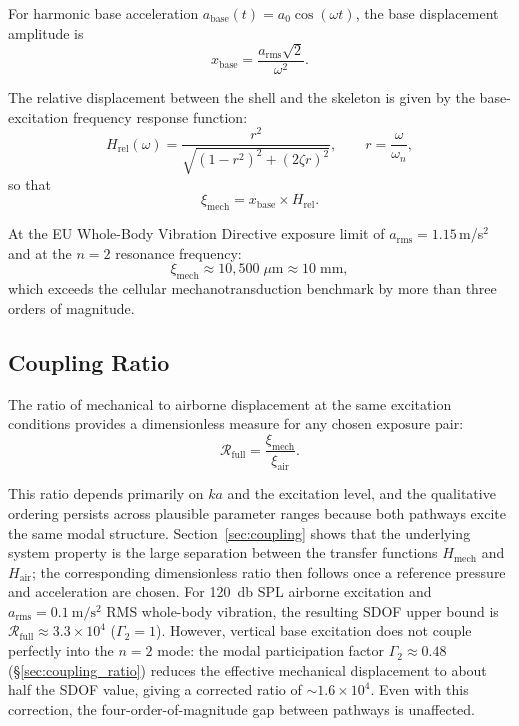 For harmonic base acceleration $a_\mathrm{base}(t) = a_0 \cos(\omega t)$, the
base displacement amplitude is
\begin{equation}\label{eq:xbase}
  x_\mathrm{base} = \frac{a_\mathrm{rms} \sqrt{2}}{\omega^2}.
\end{equation}

The relative displacement between the shell and the skeleton is given by the
base-excitation frequency response function:
\begin{equation}\label{eq:Hrel}
  H_\mathrm{rel}(\omega) = \frac{r^2}{\sqrt{(1-r^2)^2 + (2\zeta r)^2}},
  \qquad r = \frac{\omega}{\omega_n},
\end{equation}
so that
\begin{equation}\label{eq:xi_mech}
  \xi_\mathrm{mech} = x_\mathrm{base} \times H_\mathrm{rel}.
\end{equation}

At the EU Whole-Body Vibration Directive exposure limit of
$a_\mathrm{rms} = 1.15$\,m/s$^2$ and at the $n = 2$ resonance frequency:
\begin{equation}
  \xi_\mathrm{mech} \approx 10{,}500\;\mu\text{m} \approx 10\;\text{mm},
\end{equation}
which exceeds the cellular mechanotransduction benchmark by more than three orders
of magnitude.


\subsection{Coupling Ratio}\label{sec:ratio}

The ratio of mechanical to airborne displacement at the same excitation
conditions provides a dimensionless measure for any chosen exposure pair:
\begin{equation}\label{eq:coupling_ratio_def}
  \mathcal{R}_\mathrm{full} = \frac{\xi_\mathrm{mech}}{\xi_\mathrm{air}}.
\end{equation}

This ratio depends primarily on $ka$ and the excitation level, and
the qualitative ordering persists across plausible parameter ranges
because both pathways excite the same modal structure.  Section~\ref{sec:coupling}
shows that the underlying system property is the large separation between the
transfer functions $H_\mathrm{mech}$ and $H_\mathrm{air}$; the corresponding
dimensionless ratio then follows once a reference pressure and acceleration are
chosen.  For \SI{120}{\decibel} SPL airborne excitation and
$a_\mathrm{rms} = \SI{0.1}{\metre\per\second\squared}$ RMS whole-body
vibration, the resulting SDOF upper bound is
$\mathcal{R}_\mathrm{full} \approx 3.3 \times 10^4$ ($\Gamma_2 = 1$).  However,
vertical base excitation does not couple
perfectly into the $n = 2$ mode: the modal participation factor
$\Gamma_2 \approx 0.48$ (\S\ref{sec:coupling_ratio}) reduces the effective
mechanical displacement to about half the SDOF value, giving a corrected
ratio of $\sim 1.6 \times 10^4$.  Even with this correction, the four-order-of-magnitude
gap between pathways is unaffected.
